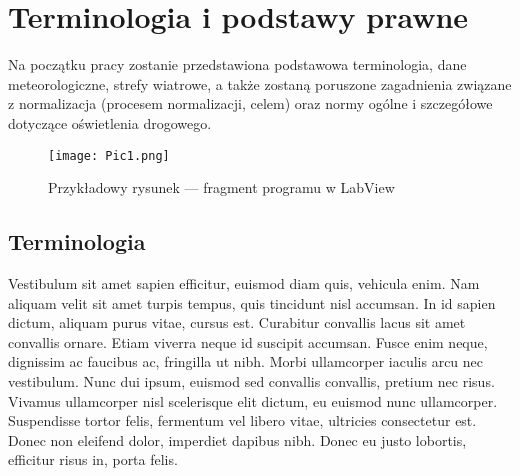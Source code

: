 \documentclass[skorowidz,xodstep,magisterska]{dyplomWIZUTMJ}
\begin{document}
%
\chapter{Terminologia i podstawy prawne \label{chap:TerminologiaIPodstawyPrawne}}

Na początku pracy zostanie przedstawiona podstawowa terminologia, dane meteorologiczne, strefy wiatrowe, a także zostaną poruszone zagadnienia związane z normalizacja (procesem normalizacji, celem) oraz normy ogólne i szczegółowe dotyczące oświetlenia drogowego. 


\begin{figure}[H]
	\centering
	\texttt{[image: Pic1.png]}
	\caption[fragment programu w LabView]{Przykładowy rysunek --- fragment programu w LabView}
	\label{fig:pic1}
\end{figure}


		\section{Terminologia\label{sec:Terminologia}}	
		Vestibulum sit amet sapien efficitur, euismod diam quis, vehicula enim. Nam aliquam velit sit amet turpis tempus, quis tincidunt nisl accumsan. In id sapien dictum, aliquam purus vitae, cursus est. Curabitur convallis lacus sit amet convallis ornare. Etiam viverra neque id suscipit accumsan. Fusce enim neque, dignissim ac faucibus ac, fringilla ut nibh. Morbi ullamcorper iaculis arcu nec vestibulum. Nunc dui ipsum, euismod sed convallis convallis, pretium nec risus. Vivamus ullamcorper nisl scelerisque elit dictum, eu euismod nunc ullamcorper. Suspendisse tortor felis, fermentum vel libero vitae, ultricies consectetur est. Donec non eleifend dolor, imperdiet dapibus nibh. Donec eu justo lobortis, efficitur risus in, porta felis.


			
\end{document}

